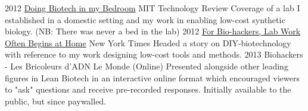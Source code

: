 \documentclass[]{friggeri-cv} %
\begin{document}
\begin{entrylist}
\entry
{2012}
{\href{http://www.technologyreview.com/news/426885/doing-biotech-in-my-bedroom/}{Doing Biotech in my Bedroom}}
{MIT Technology Review}
{Coverage of a lab I established in a domestic setting and my work in enabling 
low-cost synthetic biology. (NB: There was never a bed in the lab)
}
\entry
{2012}
{\href{http://www.nytimes.com/2012/01/17/science/for-bio-hackers-lab-work-often-begins-at-home.html?_r=0}{For Bio-hackers, Lab Work Often Begins at Home}}
{New York Times}
{Headed a story on DIY-biotechnology with reference to my work designing low-cost tools and methods.
}
\entry
{2013}
{Biohackers - Les Bricoleurs d'ADN}
{Le Monde (Online)}
{Presented alongside other leading figures in Lean Biotech in an interactive online
format which encouraged viewers to "ask" questions and receive pre-recorded responses.
Initially available to the public, but since paywalled. 
}

\end{entrylist}
\end{document}
